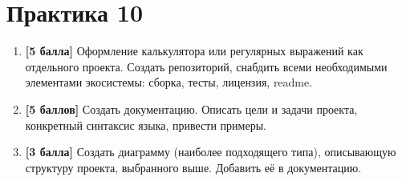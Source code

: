 \section{Практика 10}

\begin{enumerate}
    \item \textbf{[5 балла]} Оформление калькулятора или регулярных выражений как отдельного проекта. Создать репозиторий, снабдить всеми необходимыми элементами экосистемы: сборка, тесты, лицензия, readme.
    \item \textbf{[5 баллов]} Создать документацию. Описать цели и задачи проекта, конкретный синтаксис языка, привести примеры.
    \item \textbf{[3 балла]} Создать диаграмму (наиболее подходящего типа), описывающую структуру проекта, выбранного выше. Добавить её в документацию.
\end{enumerate}
